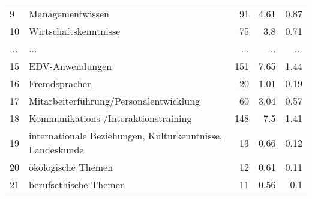 \begin{longtable}{lXrrr}
        9 & \multicolumn{1}{X}{Managementwissen} & %
          \num{91} &
          \num[round-mode=places,round-precision=2]{4.61} &
          \num[round-mode=places,round-precision=2]{0.87} \\
        10 & \multicolumn{1}{X}{Wirtschaftskenntnisse} & %
          \num{75} &
          \num[round-mode=places,round-precision=2]{3.8} &
          \num[round-mode=places,round-precision=2]{0.71} \\
       ... & ... & ... & ... & ... \\
        15 & \multicolumn{1}{X}{EDV-Anwendungen} & %
          \num{151} &
          \num[round-mode=places,round-precision=2]{7.65} &
          \num[round-mode=places,round-precision=2]{1.44} \\

        16 & \multicolumn{1}{X}{Fremdsprachen} & %
          \num{20} &
          \num[round-mode=places,round-precision=2]{1.01} &
          \num[round-mode=places,round-precision=2]{0.19} \\

        17 & \multicolumn{1}{X}{Mitarbeiterführung/Personalentwicklung} & %
          \num{60} &
          \num[round-mode=places,round-precision=2]{3.04} &
          \num[round-mode=places,round-precision=2]{0.57} \\

        18 & \multicolumn{1}{X}{Kommunikations-/Interaktionstraining} & %
          \num{148} &
          \num[round-mode=places,round-precision=2]{7.5} &
          \num[round-mode=places,round-precision=2]{1.41} \\

        19 & \multicolumn{1}{X}{internationale Beziehungen, Kulturkenntnisse, Landeskunde} & %
          \num{13} &
          \num[round-mode=places,round-precision=2]{0.66} &
          \num[round-mode=places,round-precision=2]{0.12} \\

        20 & \multicolumn{1}{X}{ökologische Themen} & %
          \num{12} &
          \num[round-mode=places,round-precision=2]{0.61} &
          \num[round-mode=places,round-precision=2]{0.11} \\

        21 & \multicolumn{1}{X}{berufsethische Themen} & %
          \num{11} &
          \num[round-mode=places,round-precision=2]{0.56} &
          \num[round-mode=places,round-precision=2]{0.1} \\


\end{longtable}
